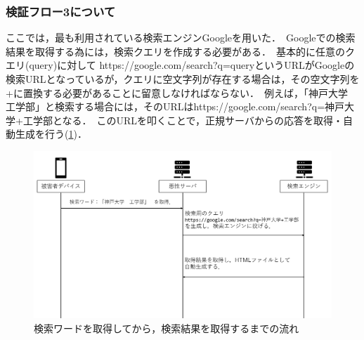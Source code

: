 \documentclass[dvipdfmx]{jsarticle}
\begin{document}
            \subsubsection{検証フロー3について}
                ここでは，最も利用されている検索エンジンGoogleを用いた．\
                Googleでの検索結果を取得する為には，検索クエリを作成する必要がある．\
                基本的に任意のクエリ(query)に対して https://google.com/search?q=queryというURLがGoogleの検索URLとなっているが，クエリに空文字列が存在する場合は，その空文字列を+に置換する必要があることに留意しなければならない．\
                例えば，「神戸大学　工学部」と検索する場合には，そのURLはhttps://google.com/search?q=神戸大学+工学部となる．\
                このURLを叩くことで，正規サーバからの応答を取得・自動生成を行う(\ref{flow-no3})．\\
                \begin{figure}[pt]
                    \centering
                    \includegraphics[width=15cm]{img/vc-vf-3.png}
                    \caption{検索ワードを取得してから，検索結果を取得するまでの流れ}
                    \label{flow-no3} 
                \end{figure}
                \clearpage
\end{document}
